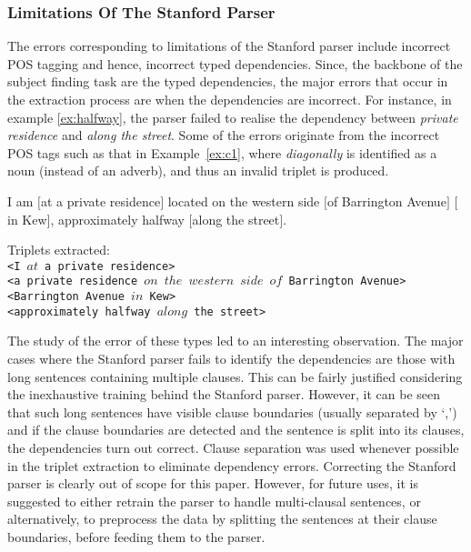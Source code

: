 \documentclass[letter]{sig-alternate}
\begin{document}
\subsubsection{Limitations Of The Stanford Parser}
\label{subsub:stanford}
The errors corresponding to limitations of the Stanford parser include incorrect POS tagging and hence, incorrect typed dependencies. Since, the backbone of the subject finding task are the typed dependencies, the major errors that occur in the extraction process are when the dependencies are incorrect. For instance, in example \ref{ex:halfway}, the parser failed to realise the dependency between \textit{private residence} and \textit{along the street}. Some of the errors originate from the incorrect POS tags such as that in Example~\ref{ex:c1}, where \textit{diagonally} is identified as a noun (instead of an adverb), and thus an invalid triplet is produced. \vspace{-0.05in}
\begin{example}
\label{ex:halfway}
I am $[$at a private residence$]$ located on the western side $[$of Barrington Avenue$]$ $[$in Kew$]$, approximately halfway $[$along the street$]$. \vspace{-0.05in}
\end{example}
Triplets extracted:\\
\texttt{<I $at$ a private residence>}\\
\texttt{<a private residence  $on$  $the$ $western$ $side$ $of$ Barrington Avenue>}\\
\texttt{<Barrington Avenue $in$ Kew>}\\
\texttt{<approximately halfway $along$ the street>} \vspace{0.05in}

The study of the error of these types led to an interesting observation. The major cases where the Stanford parser fails to identify the dependencies are those with long sentences containing multiple clauses. This can be fairly justified considering the inexhaustive training behind the Stanford parser. However, it can be seen that such long sentences have visible clause boundaries (usually separated by `,') and if the clause boundaries are detected and the sentence is split into its clauses, the dependencies turn out correct. Clause separation was used whenever possible in the triplet extraction to eliminate dependency errors. Correcting the Stanford parser is clearly out of scope for this paper. However, for future uses, it is suggested to either retrain the parser to handle multi-clausal sentences, or alternatively, to preprocess the data by splitting the sentences at their clause boundaries, before feeding them to the parser.
\end{document}
